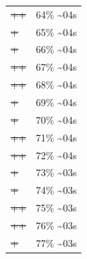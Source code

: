 \documentclass[12pt]{article}
\begin{document}
\begin{center}
\begin{tabular}{ll}
\sout{\sout{\sout{\sout{\sout{\sout{\sout{\sout{\sout{\sout{\sout{\sout{\sout{\sout{\sout{++}}}}}}}}}}}}}}} & 64\% \textasciitilde{}04s\\
\sout{\sout{\sout{\sout{\sout{\sout{\sout{\sout{\sout{\sout{\sout{\sout{\sout{\sout{\sout{\sout{+}}}}}}}}}}}}}}}} & 65\% \textasciitilde{}04s\\
\sout{\sout{\sout{\sout{\sout{\sout{\sout{\sout{\sout{\sout{\sout{\sout{\sout{\sout{\sout{\sout{+}}}}}}}}}}}}}}}} & 66\% \textasciitilde{}04s\\
\sout{\sout{\sout{\sout{\sout{\sout{\sout{\sout{\sout{\sout{\sout{\sout{\sout{\sout{\sout{\sout{++}}}}}}}}}}}}}}}} & 67\% \textasciitilde{}04s\\
\sout{\sout{\sout{\sout{\sout{\sout{\sout{\sout{\sout{\sout{\sout{\sout{\sout{\sout{\sout{\sout{++}}}}}}}}}}}}}}}} & 68\% \textasciitilde{}04s\\
\sout{\sout{\sout{\sout{\sout{\sout{\sout{\sout{\sout{\sout{\sout{\sout{\sout{\sout{\sout{\sout{\sout{+}}}}}}}}}}}}}}}}} & 69\% \textasciitilde{}04s\\
\sout{\sout{\sout{\sout{\sout{\sout{\sout{\sout{\sout{\sout{\sout{\sout{\sout{\sout{\sout{\sout{\sout{+}}}}}}}}}}}}}}}}} & 70\% \textasciitilde{}04s\\
\sout{\sout{\sout{\sout{\sout{\sout{\sout{\sout{\sout{\sout{\sout{\sout{\sout{\sout{\sout{\sout{\sout{++}}}}}}}}}}}}}}}}} & 71\% \textasciitilde{}04s\\
\sout{\sout{\sout{\sout{\sout{\sout{\sout{\sout{\sout{\sout{\sout{\sout{\sout{\sout{\sout{\sout{\sout{++}}}}}}}}}}}}}}}}} & 72\% \textasciitilde{}04s\\
\sout{\sout{\sout{\sout{\sout{\sout{\sout{\sout{\sout{\sout{\sout{\sout{\sout{\sout{\sout{\sout{\sout{\sout{+}}}}}}}}}}}}}}}}}} & 73\% \textasciitilde{}03s\\
\sout{\sout{\sout{\sout{\sout{\sout{\sout{\sout{\sout{\sout{\sout{\sout{\sout{\sout{\sout{\sout{\sout{\sout{+}}}}}}}}}}}}}}}}}} & 74\% \textasciitilde{}03s\\
\sout{\sout{\sout{\sout{\sout{\sout{\sout{\sout{\sout{\sout{\sout{\sout{\sout{\sout{\sout{\sout{\sout{\sout{++}}}}}}}}}}}}}}}}}} & 75\% \textasciitilde{}03s\\
\sout{\sout{\sout{\sout{\sout{\sout{\sout{\sout{\sout{\sout{\sout{\sout{\sout{\sout{\sout{\sout{\sout{\sout{++}}}}}}}}}}}}}}}}}} & 76\% \textasciitilde{}03s\\
\sout{\sout{\sout{\sout{\sout{\sout{\sout{\sout{\sout{\sout{\sout{\sout{\sout{\sout{\sout{\sout{\sout{\sout{\sout{+}}}}}}}}}}}}}}}}}}} & 77\% \textasciitilde{}03s\\

\end{tabular}
\end{center}
\end{document}
